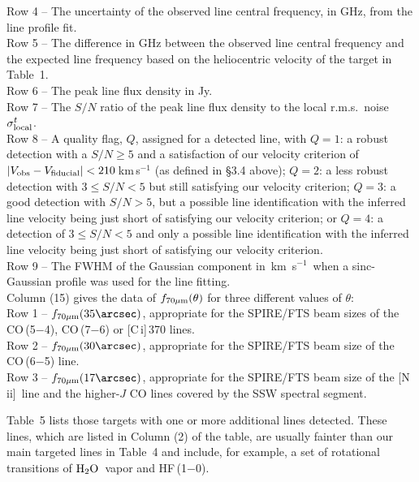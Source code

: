 \documentclass[preprint]{aastex}
\newcommand{\kms}{\mbox{\,km~s$^{-1}$}}
\newcommand{\Water}{\mbox{${\rm H}_2{\rm O}$}}
\newcommand{\CI}{[C\,{\sc i}]}
\newcommand{\NII}{\mbox{[N\,{\sc ii}]}}
\begin{document}
Row  4 -- The uncertainty of the observed line central frequency, in GHz, from the line profile fit.\\
Row  5 -- The difference in GHz between the observed line central frequency and the expected line frequency 
          based on the heliocentric velocity of the target in Table~1.\\
Row  6 -- The peak line flux density in Jy.\\
Row  7 -- The $S/N$ ratio of the peak line flux density to the local r.m.s.~noise $\sigma^t_{\rm local}$.\\  
Row  8 -- A quality flag, $Q$, assigned for a detected line, with $Q = 1$: a robust detection
          with a $S/N \geqslant 5$ and a satisfaction of our velocity criterion of 
	    $|V_{\rm obs} - V_{\rm fiducial}| < 210$\,km\,s$^{-1}$ (as defined in \S3.4 above);
          $Q = 2$: a less robust detection with $3 \leqslant S/N < 5$ but still satisfying our velocity criterion;
          $Q = 3$: a good detection with $S/N > 5$, but a possible line identification with 
	    the inferred line velocity being just short of satisfying our velocity criterion; or 
          $Q = 4$: a detection of $3 \leqslant S/N < 5$ and only a possible line identification with 
          the inferred line velocity being just short of satisfying our velocity criterion. \\ 
Row  9 -- The FWHM of the Gaussian component in \kms\ when a sinc-Gaussian profile was used for the line fitting. \\
Column (15) gives the data of $f_{70\mu{\rm m}}(\theta)$ for three different values of $\theta$: \\
Row  1 -- $f_{70\mu{\rm m}}(35\arcsec)$, appropriate for the SPIRE/FTS beam sizes of the CO\,(5$-$4), 
          CO\,(7$-6$) or \CI\,370 lines. \\
Row  2 -- $f_{70\mu{\rm m}}(30\arcsec)$, appropriate for the SPIRE/FTS beam size of the CO\,(6$-$5) line.\\
Row  3 -- $f_{70\mu{\rm m}}(17\arcsec)$, appropriate for the SPIRE/FTS beam size of the \NII\ line and
	    the higher-$J$ CO lines covered by the SSW spectral segment.



Table~5 lists those targets with one or more additional lines detected. These lines, which are 
listed in Column (2) of the table, are usually fainter than our main targeted lines in Table~4 
and include, for example, a set of rotational transitions of \Water\ vapor and HF\,(1$-$0).  
\end{document}
